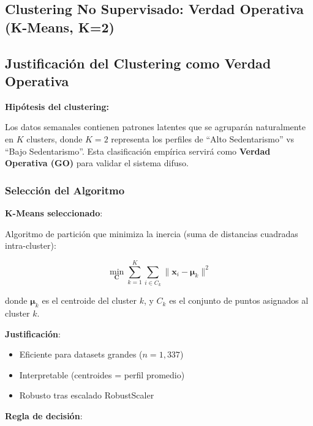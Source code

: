 \documentclass[12pt,letterpaper,twoside]{report}
\newcommand{\vect}[1]{\boldsymbol{#1}}
\newcommand{\mat}[1]{\mathbf{#1}}
\begin{document}
\begin{calculobox}
\chapter{Clustering No Supervisado: Verdad Operativa (K-Means, K=2)}

\section{Justificación del Clustering como Verdad Operativa}

\begin{hipotesisbox}
\textbf{Hipótesis del clustering:}

Los datos semanales contienen patrones latentes que se agruparán naturalmente en $K$ clusters, donde $K=2$ representa los perfiles de ``Alto Sedentarismo'' vs ``Bajo Sedentarismo''. Esta clasificación empírica servirá como \textbf{Verdad Operativa (GO)} para validar el sistema difuso.
\end{hipotesisbox}

\subsection{Selección del Algoritmo}

\begin{estadisticobox}
\textbf{K-Means seleccionado}:

Algoritmo de partición que minimiza la inercia (suma de distancias cuadradas intra-cluster):

\begin{equation}
\min_{\mat{C}} \sum_{k=1}^{K} \sum_{i \in C_k} \|\vect{x}_i - \vect{\mu}_k\|^2
\end{equation}

donde $\vect{\mu}_k$ es el centroide del cluster $k$, y $C_k$ es el conjunto de puntos asignados al cluster $k$.

\textbf{Justificación}:
\begin{itemize}[noitemsep]
    \item Eficiente para datasets grandes ($n=1,337$)
    \item Interpretable (centroides = perfil promedio)
    \item Robusto tras escalado RobustScaler
\end{itemize}
\end{estadisticobox}

\begin{reglabox}
\textbf{Regla de decisión}:


\end{reglabox}
\end{calculobox}
\end{document}
